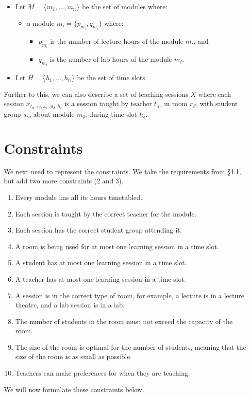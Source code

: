 \begin{itemize}
	\item Let \( M = \{ m_1, \ldots, m_n \} \) be the set of modules where:
	\begin{itemize}
		\item a module \( m_i = \{ p_{m_i}, q_{m_i} \} \) where:
		\begin{itemize}
			\item \( p_{m_i} \) is the number of lecture hours of the module 
				\( m_i \), and 
			\item \( q_{m_i} \) is the number of lab hours of the module 
				\( m_i \).
		\end{itemize}
	\end{itemize}
	\item Let \( H = \{ h_1 , \ldots , h_n \} \) be the set of time slots.
\end{itemize}
Further to this, we can also describe a set of teaching sessions \( X \) where 
each session \( x_{t_{\alpha},r_{\beta},s_{\gamma},m_{\delta},h_{\epsilon}} \) 
is a session taught by teacher \( t_{\alpha} \), in room \( r_{\beta} \), with 
student group \( s_{\gamma} \), about module \( m_{\delta} \), during time slot
\( h_{\epsilon} \).

\section{Constraints}

We next need to represent the constraints. We take the requirements from \S 1.1,
but add two more constraints (2 and 3).
\begin{enumerate}
	\item Every module has all its hours timetabled.
	\item Each session is taught by the correct teacher for the module.
	\item Each session has the correct student group attending it.
	\item A room is being used for at most one learning session in a time slot.
	\item A student has at most one learning session in a time slot.
	\item A teacher has at most one learning session in a time slot.
	\item A session is in the correct type of room, for example, a lecture is in 
		a lecture theatre, and a lab session is in a lab.
	\item The number of students in the room must not exceed the capacity of the
		room.
	\item The size of the room is optimal for the number of students, meaning 
		that the size of the room is as small as possible.
	\item Teachers can make preferences for when they are teaching.
\end{enumerate}
We will now formulate these constraints below.

